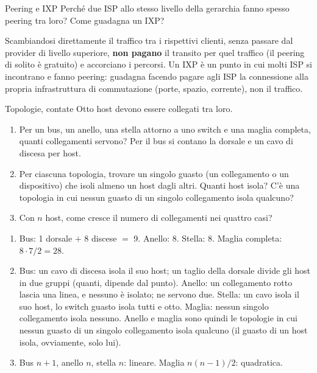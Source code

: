 \begin{esercizio}{Peering e IXP}
Perché due ISP allo stesso livello della gerarchia fanno spesso peering tra loro? Come guadagna un IXP?

\svolgimento
Scambiandosi direttamente il traffico tra i rispettivi clienti, senza passare dal provider di livello superiore, \textbf{non pagano}
il transito per quel traffico (il peering di solito è gratuito) e accorciano i percorsi. Un IXP è un punto in cui molti ISP si
incontrano e fanno peering: guadagna facendo pagare agli ISP la connessione alla propria infrastruttura di commutazione (porte, spazio,
corrente), non il traffico.
\end{esercizio}

\begin{esercizio}{Topologie, contate}
Otto host devono essere collegati tra loro.
\begin{enumerate}[label=(\alph*)]
    \item Per un bus, un anello, una stella attorno a uno switch e una maglia completa, quanti collegamenti servono? Per il bus si contano
          la dorsale e un cavo di discesa per host.
    \item Per ciascuna topologia, trovare un singolo guasto (un collegamento o un dispositivo) che isoli almeno un host dagli altri.
          Quanti host isola? C'è una topologia in cui nessun guasto di un singolo collegamento isola qualcuno?
    \item Con $n$ host, come cresce il numero di collegamenti nei quattro casi?
\end{enumerate}

\svolgimento
\begin{enumerate}[label=(\alph*)]
    \item Bus: 1 dorsale $+$ 8 discese $=$ 9. Anello: 8. Stella: 8. Maglia completa: $8 \cdot 7/2 = 28$.
    \item Bus: un cavo di discesa isola il suo host; un taglio della dorsale divide gli host in due gruppi (quanti, dipende dal punto).
          Anello: un collegamento rotto lascia una linea, e nessuno è isolato; ne servono due. Stella: un cavo isola il suo host, lo switch
          guasto isola tutti e otto. Maglia: nessun singolo collegamento isola nessuno. Anello e maglia sono quindi le topologie in cui nessun
          guasto di un singolo collegamento isola qualcuno (il guasto di un host isola, ovviamente, solo lui).
    \item Bus $n + 1$, anello $n$, stella $n$: lineare. Maglia $n(n-1)/2$: quadratica.
\end{enumerate}
\end{esercizio}

